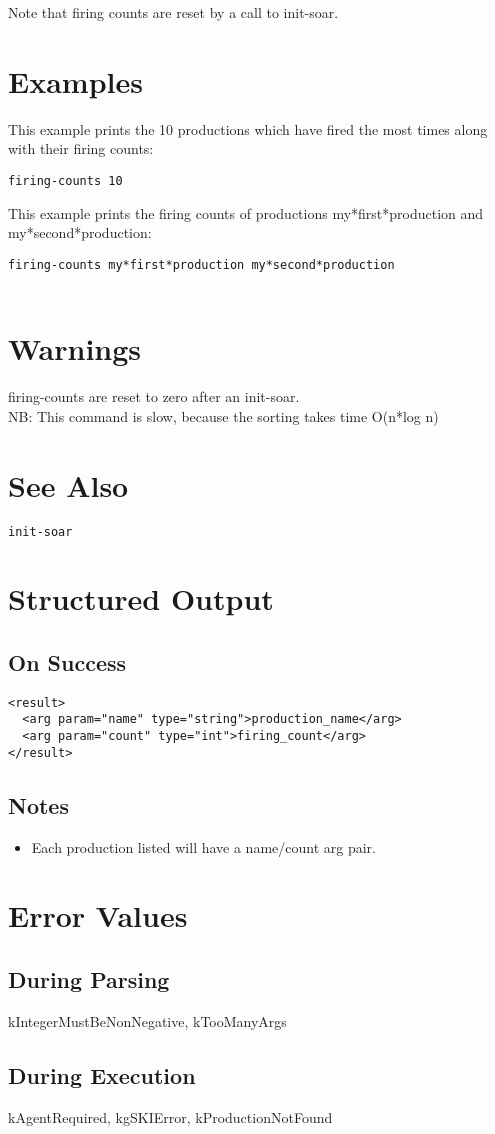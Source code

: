 \documentclass[10pt]{article}
\begin{document}
 Note that firing counts are reset by a call to init-soar. 
\section*{ Examples }


 This example prints the 10 productions which have fired the most times along with their firing counts: \begin{verbatim}
firing-counts 10

\end{verbatim}



 This example prints the firing counts of productions my*first*production and my*second*production: \begin{verbatim}
firing-counts my*first*production my*second*production


\end{verbatim}

\section*{ Warnings }


 firing-counts are reset to zero after an init-soar. \\ 
 NB: This command is slow, because the sorting takes time O(n*log n) 
\section*{ See Also }
\begin{verbatim}
init-soar

\end{verbatim}
\section*{ Structured Output }
\subsection*{ On Success }
\begin{verbatim}
<result>
  <arg param="name" type="string">production_name</arg>
  <arg param="count" type="int">firing_count</arg>
</result>

\end{verbatim}
\subsection*{ Notes }
\begin{itemize}
\item  Each production listed will have a name/count arg pair. 

\end{itemize}
\section*{ Error Values }
\subsection*{ During Parsing }


 kIntegerMustBeNonNegative, kTooManyArgs
\subsection*{ During Execution }


 kAgentRequired, kgSKIError, kProductionNotFound
\end{document}
